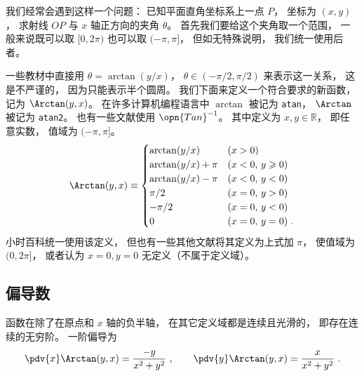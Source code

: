 

我们经常会遇到这样一个问题： 已知平面直角坐标系上一点 $P$， 坐标为 $(x, y)$， 求射线 $OP$ 与 $x$ 轴正方向的夹角 $\theta$。%
首先我们要给这个夹角取一个范围， 一般来说既可以取 $[0, 2\pi)$ 也可以取 $(-\pi, \pi]$， 但如无特殊说明， 我们统一使用后者。

一些教材中直接用 $\theta = \arctan(y/x)$， $\theta \in (-\pi/2, \pi/2)$ 来表示这一关系， 这是不严谨的， 因为只能表示半个圆周。 我们下面来定义一个符合要求的新函数， 记为 $\Arctan(y, x)$。 在许多计算机编程语言中 $\arctan$ 被记为 \lstinline|atan|， $\Arctan$ 被记为 \lstinline|atan2|。 也有一些文献使用 $\opn{Tan}^{-1}$。 其中定义为 $x, y \in \mathbb R$， 即任意实数， 值域为 $(-\pi, \pi]$。
\begin{equation}\label{eq_Arctan_1}
\Arctan(y,x) \equiv 
\begin{cases}
\arctan (y/x) \quad &(x > 0)\\
\arctan (y/x) + \pi  &(x < 0,\,y \geqslant 0)\\
\arctan (y/x) - \pi  &(x < 0,\,y < 0)\\
\pi /2  &(x = 0, \,y > 0)\\
 -\pi /2  &(x = 0, \,y < 0)\\
0 & (x=0,\,y=0)~.
\end{cases}
\end{equation}
小时百科统一使用该定义， 但也有一些其他文献将其定义为上式加 $\pi$， 使值域为 $(0, 2\pi]$， 或者认为 $x = 0, y = 0$ 无定义（不属于定义域）。

\subsection{偏导数}
函数在除了在原点和 $x$ 轴的负半轴， 在其它定义域都是连续且光滑的， 即存在连续的无穷阶。 一阶偏导为
\begin{equation}
\pdv{x} \Arctan(y, x) = \frac{-y}{x^2 + y^2} ~,\qquad
\pdv{y} \Arctan(y, x) = \frac{x}{x^2 + y^2}~.
\end{equation}
